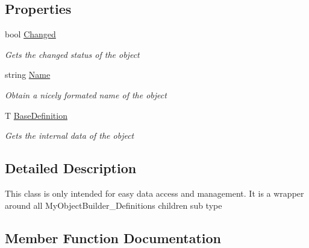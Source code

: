 \subsection*{Properties}
\begin{DoxyCompactItemize}
\item 
bool \hyperlink{class_s_e_mod_a_p_i_1_1_a_p_i_1_1_definitions_1_1_over_layer_definition_af7a6e8513be271e5d5cf55d45ea1c6ac}{Changed}
\begin{DoxyCompactList}\small\item\em Gets the changed status of the object \end{DoxyCompactList}\item 
string \hyperlink{class_s_e_mod_a_p_i_1_1_a_p_i_1_1_definitions_1_1_over_layer_definition_abe587f8ec4dc9e52de1d1726096f6d9e}{Name}
\begin{DoxyCompactList}\small\item\em Obtain a nicely formated name of the object \end{DoxyCompactList}\item 
T \hyperlink{class_s_e_mod_a_p_i_1_1_a_p_i_1_1_definitions_1_1_over_layer_definition_a27ed65eda2a36aa854a84ae7bf853a8f}{Base\+Definition}
\begin{DoxyCompactList}\small\item\em Gets the internal data of the object \end{DoxyCompactList}\end{DoxyCompactItemize}


\subsection{Detailed Description}
This class is only intended for easy data access and management. It is a wrapper around all My\+Object\+Builder\+\_\+\+Definitions children sub type 



\subsection{Member Function Documentation}
\hypertarget{class_s_e_mod_a_p_i_1_1_a_p_i_1_1_definitions_1_1_over_layer_definition_af48cb6a6a26d25dc6634b6e7dbf6cd5a}{}
